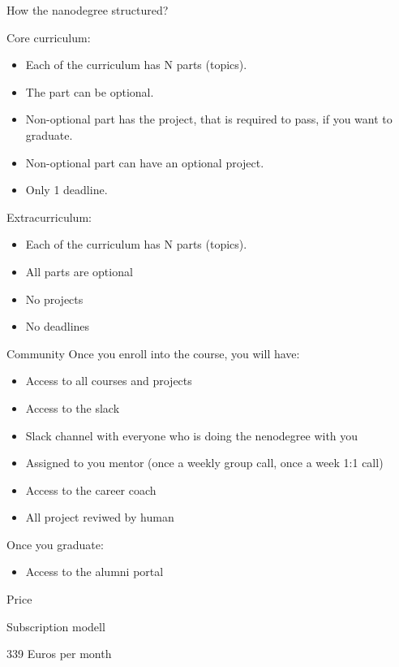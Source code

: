 \documentclass{beamer}
\begin{document}
\begin{frame}{How the nanodegree structured?}

Core curriculum:
\begin{itemize}
\item Each of the curriculum has N parts (topics).
\item The part can be optional.
\item Non-optional part has the project, that is required to pass, if you want to graduate.
\item Non-optional part can have an optional project.
\item Only 1 deadline.
\end{itemize}

Extracurriculum:
\begin{itemize}
\item Each of the curriculum has N parts (topics).
\item All parts are optional
\item No projects
\item No deadlines
\end{itemize}

\end{frame}

\begin{frame}{Community}
Once you enroll into the course, you will have:
\begin{itemize}
\item Access to all courses and projects
\item Access to the slack
\item Slack channel with everyone who is doing the nenodegree with you
\item Assigned to you mentor (once a weekly group call, once a week 1:1 call)
\item Access to the career coach
\item All project reviwed by human
\end{itemize}

Once you graduate:
\begin{itemize}
\item Access to the alumni portal
\end{itemize}
\end{frame}

\begin{frame}{Price}
\begin{center}
Subscription modell

339 Euros per month
\end{center}
\end{frame}
\end{document}
